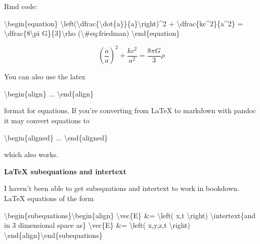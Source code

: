 \documentclass[]{book}
\newenvironment{Shaded}{\begin{snugshade}}{\end{snugshade}}
\newcommand{\BaseNTok}[1]{\textcolor[rgb]{0.00,0.00,0.81}{#1}}
\newcommand{\NormalTok}[1]{#1}
\begin{document}
Rmd code:

\begin{Shaded}
\begin{Highlighting}[]
\NormalTok{\textbackslash{}begin\{equation\}}
\BaseNTok{    \textbackslash{}left(\textbackslash{}dfrac\{\textbackslash{}dot\{a\}\}\{a\}\textbackslash{}right)^2 + \textbackslash{}dfrac\{kc^2\}\{a^2\} = \textbackslash{}dfrac\{8\textbackslash{}pi G\}\{3\}\textbackslash{}rho}
\NormalTok{(\textbackslash{}#eq:friedman)}
\NormalTok{\textbackslash{}end\{equation\}}
\end{Highlighting}
\end{Shaded}

\begin{equation}
    \left(\dfrac{\dot{a}}{a}\right)^2 + \dfrac{kc^2}{a^2} = \dfrac{8\pi G}{3}\rho
\label{eq:friedman}
\end{equation}

You can also use the latex

\begin{Shaded}
\begin{Highlighting}[]
\NormalTok{\textbackslash{}begin\{align\}}
\NormalTok{...}
\NormalTok{\textbackslash{}end\{align\}}
\end{Highlighting}
\end{Shaded}

format for equations. If you're converting from LaTeX to markdown with pandoc it may convert equations to

\begin{Shaded}
\begin{Highlighting}[]
\NormalTok{\textbackslash{}begin\{aligned\}}
\NormalTok{...}
\NormalTok{\textbackslash{}end\{aligned\}}
\end{Highlighting}
\end{Shaded}

which also works.

\textbf{LaTeX subequations and intertext}

I haven't been able to get subequations and intertext to work in bookdown. LaTeX equations of the form

\begin{Shaded}
\begin{Highlighting}[]
\NormalTok{\textbackslash{}begin\{subequations\}\textbackslash{}begin\{align\}}
\NormalTok{\textbackslash{}vec\{E\} &= \textbackslash{}left( x,t \textbackslash{}right)}
\NormalTok{\textbackslash{}intertext\{and in 3 dimensional space as\}}
\NormalTok{\textbackslash{}vec\{E\} &= \textbackslash{}left( x,y,z,t \textbackslash{}right)}
\NormalTok{\textbackslash{}end\{align\}\textbackslash{}end\{subequations\}}
\end{Highlighting}
\end{Shaded}
\end{document}
